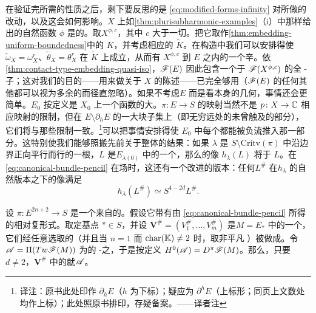 在验证完所需的性质之后，剩下要反思的是 \eqref{eq:modified-forms-infinity} 对\trSymplecticStructure{}所做的改动，以及这会如何影响\trFukayaCategory。$X$ 上如\cref{thm:plurisubharmonic-examples}（i）中那样给出的自然\trPlurisubharmonic{}函数 $\phi$ 是\trFiniteType{}的。取\trSublevelSet{}$X^{\phi,c}$，其中 $c$ 大于一切\trCriticalValue。把它取作\cref{thm:embedding-uniform-boundedness}中的 $K$，并考虑相应的 $\tilde{K}$。在构造中我们可以安排得使 $\tilde{\omega}_X=\omega^r_X$、$\tilde{\theta}_X=\theta^r_X$ 在 $\tilde{K}$ 上成立，从而有 $X^{\phi,c}$ 到 $E$ 之内的一个\trExact{}辛\trEmbedding。依\cref{thm:contact-type-embedding-quasi-iso}，$\mathscr{F}(E)$ 因此包含一个\trQuasiequivalent{}于 $\mathscr{F}(X^{\phi,c})$ 的全 \trAinfty-子\trCategory；这对我们的目的——用\trLefschetzFibration{}来做关于 $X$ 的陈述——已完全够用（$\mathscr{F}(E)$ 的任何其他\trObject{}都可以视为多余的而径直忽略）。如果不考虑\trTotalSpace{}$E$ 而是看\trFibration{}本身的几何，事情还会更简单。\trFiber{}$E_0$ 按定义是 $X_0$ 上一个\trPlurisubharmonic{}函数的大\trSublevelSet。$\pi\colon E\to S$ 的\trParallelTransport{}映射当然不是 $p\colon X\to\mathbb{C}$ 相应映射的限制，但在 $E\setminus\partial_h E$ 的一大块\trCompact{}子集上（即无穷远处的\trTrivialization{}未曾触及的部分），它们将与那些限制一致。\footnote{译注：原书此处印作 $\partial_h E$（$h$ 为下标）；疑应为 $\partial^h E$（上标形；同页上文数处均作上标）；此处照原书排印，存疑备案。——译者注}可以把事情安排得使 $E_0$ 中每个\trLagrange\trSubmanifold{}都能被负\trLiouville{}流推入那一部分。这特别使我们能够照搬先前关于整体\trMonodromy{}的结果：如果 $\lambda$ 是 $S\setminus\mathrm{Critv}(\pi)$ 中沿边界正向平行而行的一根\trLoop，$L$ 是\trFiber{}$E_{\lambda(0)}$ 中的一个\trExact{}\trLagrange\trSubmanifold，那么\trMonodromy{}的像 $h_\lambda(L)$ 将\trIsotopy{}于 $L$。在 \eqref{eq:canonical-bundle-pencil} 在场时，这还有一个改进的版本：任何\trExactLagrangianBrane{}$L^{\#}$ 在\trMonodromy{}$h_\lambda$ 的自然\trGrading{}版本之下的像满足
\begin{equation}\label{eq:monodromy-graded-shift}
h_\lambda(L^{\#})\simeq S^{4-2d}L^{\#}.
\end{equation}
\begin{proposition}\label{thm:vanishing-cycles-split-generate}
设 $\pi\colon E^{2n+2}\to S$ 是一个来自\trLefschetzPencil{}的\trExact\trLefschetzFibration。假设它带有由 \eqref{eq:canonical-bundle-pencil} 所得的相对复\trVolume{}形式。取定基点 $*\in S$，并设 $\boldsymbol{V}^{\#}=(V^{\#}_1,\ldots,V^{\#}_m)$ 是\trFiber{}$M=E_*$ 中\trVanishingCycle{}的一个\trBasis，它们经任意选取的\trGrading{}（并且当 $n=1$ 而 $\mathrm{char}(\mathbb{K})\neq 2$ 时，取非平凡 \trPinStructure）被做成\trLagrange\trBrane。令 $\mathscr{A}=\Pi(Tw\mathscr{F}(M))$ 为\trTwistedComplex{}的 \trAinfty-\trCategory{}之\trSplitClosure，于是按定义 $H^0(\mathscr{A})=D^{\pi}\mathscr{F}(M)$。那么，只要 $d\neq 2$，$\boldsymbol{V}^{\#}$ 中的\trObject{}就\trSplitGeneration{}$\mathscr{A}$。
\end{proposition}
